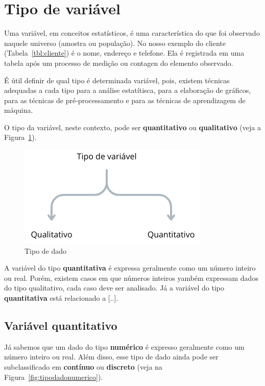\documentclass[a4paper,12pt]{book}
\begin{document}
\section{Tipo de variável}
	
Uma variável, em conceitos estatísticos, é uma característica do que foi observado naquele universo (amostra ou população). No nosso exemplo do cliente (Tabela~\ref{tbl:cliente}) é o nome, endereço e telefone. Ela é registrada em uma tabela após um processo de medição ou contagen do elemento observado. 

É útil definir de qual tipo é determinada variável, pois, existem técnicas adequadas a cada tipo para a análise estatítisca, para a elaboração de gráficos, para as técnicas de pré-processamento e para as técnicas de aprendizagem de máquina. 

O tipo da variável, neste contexto, pode ser \textbf{quantitativo} ou \textbf{qualitativo} (veja a Figura~\ref{fig:tipodado}).
	
\begin{figure}[!h]
	\centering
	\includegraphics[width=0.7\linewidth]{figuras/tipo_variavel.png}
	\caption{Tipo de dado}
	\label{fig:tipodado}
\end{figure}
	
A variável do tipo \textbf{quantitativa} é expressa geralmente como um número inteiro ou real. Porém, existem casos em que números inteiros yambém expressam dados do tipo qualitativo, cada caso deve ser analisado. Já a variável do tipo \textbf{quantitativa} está relacionado a [..]. 
	
\subsection{Variável quantitativo}
	
	Já sabemos que um dado do tipo \textbf{numérico} é expresso geralmente como um número inteiro ou real. Além disso, esse tipo de dado ainda pode ser subclassificado em \textbf{contínuo} ou \textbf{discreto} (veja na Figura~\ref{fig:tipodadonumerico}). 
	
\end{document}
